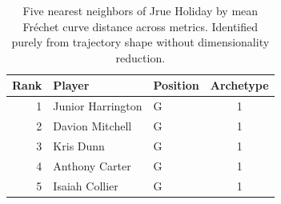 \begin{table}[htbp]
  \centering\small
  \begin{tabular}{rllc}
    \toprule
    Rank & Player & Position & Archetype \\
    \midrule
    1 & Junior Harrington & G & 1 \\
    2 & Davion Mitchell & G & 1 \\
    3 & Kris Dunn & G & 1 \\
    4 & Anthony Carter & G & 1 \\
    5 & Isaiah Collier & G & 1 \\
    \bottomrule
  \end{tabular}
  \caption{Five nearest neighbors of Jrue Holiday by mean Fr\'{e}chet curve distance across metrics. Identified purely from trajectory shape without dimensionality reduction.}
  \label{tab:Jrue_Holiday_frechet_curve_neighbors}
\end{table}

